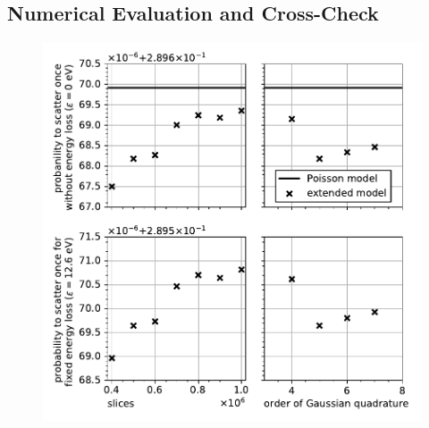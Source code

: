 \subsection{Numerical Evaluation and Cross-Check}
\label{sec:eDepScatCrossSecExtendedModelNumEval}
\begin{figure}[t]
	\centering
	\includegraphics{chapter/energyDependentCrossSec/fig/scatProb1_numericalAccuracy.pdf}

\end{figure}
